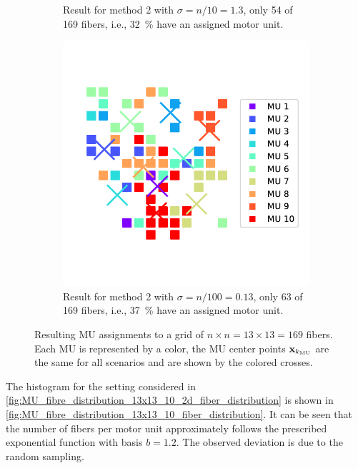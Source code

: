 \begin{figure}
\begin{subfigure}[t]{0.48\textwidth}
    \caption{Result for method 2 with $\sigma = n/10 = 1.3$, only 54 of 169 fibers, i.e., \SI{32}{\percent} have an assigned motor unit.}%
    \label{fig:MU_fibre_distribution_sparse_13x13_10_2d_fiber_distribution}%
  \end{subfigure}
  \quad
  \begin{subfigure}[t]{0.48\textwidth}%
    \centering%
    \includegraphics[width=\textwidth]{images/motor_unit_assignment/MU_fibre_distribution_sparse_13x13_10_sigma_2d_fiber_distribution.pdf}%
    \caption{Result for method 2 with $\sigma = n/100 = 0.13$, only 63 of 169 fibers, i.e., \SI{37}{\percent} have an assigned motor unit.}%
    \label{fig:MU_fibre_distribution_sparse_13x13_10_sigma_2d_fiber_distribution}%
  \end{subfigure}
  \caption{Resulting MU assignments to a grid of $n\times n = 13 \times 13 = 169$ fibers. Each MU is represented by a color, the MU center points $\textbf{x}_{k_\text{MU}}$ are the same for all scenarios and are shown by the colored crosses.}%
  \label{fig:mus_results1}%
\end{figure}%

The histogram for the setting considered in \cref{fig:MU_fibre_distribution_13x13_10_2d_fiber_distribution} is shown in \cref{fig:MU_fibre_distribution_13x13_10_fiber_distribution}. It can be seen that the number of fibers per motor unit approximately follows the prescribed exponential function with basis $b=1.2$. The observed deviation is due to the random sampling.

